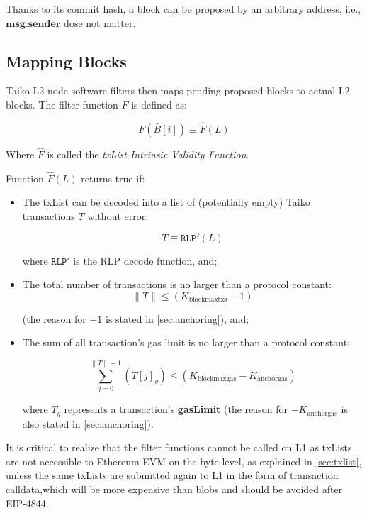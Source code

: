 \documentclass[9pt,oneside]{amsart}
\begin{document}
\begin{multicols}{2}
Thanks to its commit hash, a block can be proposed by an arbitrary address, i.e., $\mathbf{msg.sender}$ dose not matter.

\subsection{Mapping Blocks} \label{sec:filtermap}
Taiko L2 node software filters then maps pending proposed blocks to actual L2 blocks. The filter function $F$ is defined as:

\begin{equation}
F({\bar{B}[i]})  \equiv \hat{F}({L})
\end{equation}

Where $\hat{F}$ is called the \textit{txList Intrinsic Validity Function}.

Function $\hat{F}(L)$ returns true if:
\begin{itemize}
\item The txList can be decoded into a list of (potentially empty) Taiko transactions $T$ without error:

\begin{equation}
T  \equiv \texttt{RLP}'(L)
\end{equation}

where  $\texttt{RLP}'$ is the RLP decode function, and;

\item The total number of transactions is no larger than a protocol constant:
\begin{equation}
\lVert T \rVert \le (K_{\mathrm{blockmaxtxs}} - 1)
\end{equation}

 (the reason for $-1$ is stated in \ref{sec:anchoring}), and;
 
\item The sum of all transaction's gas limit is no larger than a protocol constant:

\begin{equation}
\sum_{j = 0}^{\lVert T \rVert - 1}(T[j]_g) \le (K_{\mathrm{blockmaxgas}} - K_{\mathrm{anchorgas}})
\end{equation}

where $T_g$ represents a transaction's \textbf{gasLimit} (the reason for $- K_{\mathrm{anchorgas}}$ is also stated in \ref{sec:anchoring}).


\end{itemize}

It is critical to realize that the filter functions cannot be called on L1 as txLists are not accessible to Ethereum EVM on the byte-level, as explained in \ref{sec:txlist}, unless the same txLists are submitted again to L1 in the form of transaction calldata,which will be more expensive than blobs and should be avoided after EIP-4844.


\end{multicols}
\end{document}
